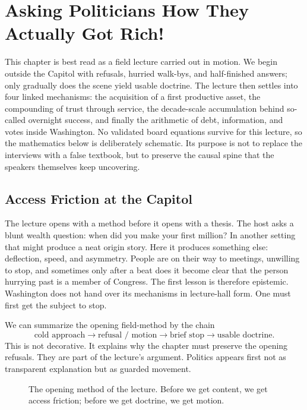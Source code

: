 \chapter{Asking Politicians How They Actually Got Rich!}

This chapter is best read as a field lecture carried out in motion. We begin outside the Capitol with refusals, hurried walk-bys, and half-finished answers; only gradually does the scene yield usable doctrine. The lecture then settles into four linked mechanisms: the acquisition of a first productive asset, the compounding of trust through service, the decade-scale accumulation behind so-called overnight success, and finally the arithmetic of debt, information, and votes inside Washington. No validated board equations survive for this lecture, so the mathematics below is deliberately schematic. Its purpose is not to replace the interviews with a false textbook, but to preserve the causal spine that the speakers themselves keep uncovering.

\section{Access Friction at the Capitol}

The lecture opens with a method before it opens with a thesis. The host asks a blunt wealth question: when did you make your first million? In another setting that might produce a neat origin story. Here it produces something else: deflection, speed, and asymmetry. People are on their way to meetings, unwilling to stop, and sometimes only after a beat does it become clear that the person hurrying past is a member of Congress. The first lesson is therefore epistemic. Washington does not hand over its mechanisms in lecture-hall form. One must first get the subject to stop.

We can summarize the opening field-method by the chain
\begin{equation}
\text{cold approach}\to \text{refusal / motion}\to \text{brief stop}\to \text{usable doctrine}.
\end{equation}
This is not decorative. It explains why the chapter must preserve the opening refusals. They are part of the lecture's argument. Politics appears first not as transparent explanation but as guarded movement.

\begin{figure}[h]
\centering
{}
\caption{The opening method of the lecture. Before we get content, we get access friction; before we get doctrine, we get motion.}
\end{figure}


